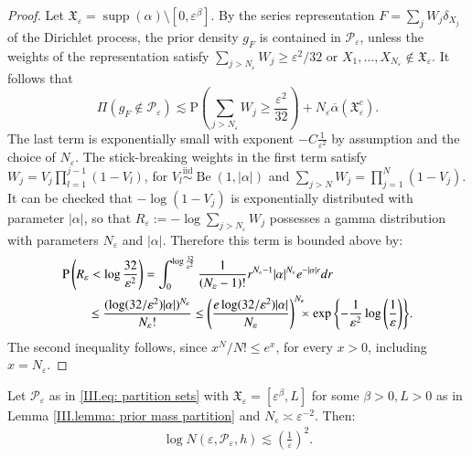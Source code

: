 \begin{proof}
    Let $\mathfrak{X}_\varepsilon = \operatorname{supp}( \alpha) \setminus [0,\varepsilon^{\beta}]$. By the series representation $F =\sum_j W_j \delta_{X_j}$ of the Dirichlet process, the prior density $g_{\scriptscriptstyle{F}}$ is contained in $\mathcal{P}_\varepsilon$, unless the weights of the representation satisfy $\sum_{j>N_\varepsilon} W_j \geq \varepsilon^2 / 32$ or $X_1,\ldots,X_{N_{\varepsilon}} \notin \mathfrak{X}_\varepsilon$. It follows that
    $$
    \Pi \left(g_{\scriptscriptstyle{F}} \notin \mathcal{P}_\varepsilon \right) \lesssim \mathrm{P} \left(\sum_{j>N_\varepsilon} W_j \geq \frac{\varepsilon^2}{32}\right) + N_\varepsilon \overline{\alpha}(\mathfrak{X}_\varepsilon^{c}).
    $$
    The last term is exponentially small with exponent $-C \frac{1}{\varepsilon^2}$ by assumption and the choice of $N_\varepsilon$.
    The stick-breaking weights in the first term satisfy $W_j=V_j \prod_{l=1}^{j-1}\left(1-V_l\right)$, for $V_l \stackrel{\mathrm{iid}}{\sim} \operatorname{Be}(1,|\alpha|)$ and $\sum_{j>N} W_j=\prod_{j=1}^N\left(1-V_j\right)$. It can be checked that $-\log \left(1-V_j\right)$ is exponentially distributed with parameter $|\alpha|$, so that $R_\varepsilon:=-\log \sum_{j>N_\varepsilon} W_j$ possesses a gamma distribution with parameters $N_\varepsilon$ and $|\alpha|$. Therefore this term is bounded above by:
    \begin{align*}
        &\mathrm{P} \left(R_\varepsilon <\log \frac{32}{\varepsilon^2}\right) =\int_0^{\log\frac{32}{\varepsilon^2}} \frac{1}{\left(N_\varepsilon -1\right) !} r^{N_\varepsilon -1}|\alpha|^{N_\varepsilon} e^{-|\alpha| r} d r  \\
        & \quad \quad \leq \frac{(\log (32 / \varepsilon^2)|\alpha|)^{N_\varepsilon}}{N_{\varepsilon} !}\leq\left(\frac{e \log (32 / \varepsilon^2)|\alpha|} {N_\varepsilon}\right)^{N_\varepsilon} \hspace{-0.2cm} \asymp \exp{\left\{ -\frac{1}{\varepsilon^2  }  \log{\left(\frac{1}{\varepsilon} \right)}   \right\}}.
    \end{align*}
    The second inequality follows, since $x^N / N ! \leq e^x$, for every $x>0$, including $x=N_{\varepsilon}$. 
\end{proof}
\begin{proposition}[Entropy]\label{III.prop: complexity bound model partition}
Let $\mathcal{P}_\varepsilon$ as in \eqref{III.eq: partition sets} with $\mathfrak{X}_\varepsilon = [\varepsilon^{\beta},L]$ for some $\beta >0, L>0$ as in Lemma \ref{III.lemma: prior mass partition} and $N_{\varepsilon} \asymp \varepsilon^{-2}$. Then:
\begin{align*}
    \log{N(\varepsilon,\mathcal{P}_\varepsilon,h)} \lesssim \left(\frac{1}{\varepsilon}\right)^2. 
\end{align*}
\end{proposition}
